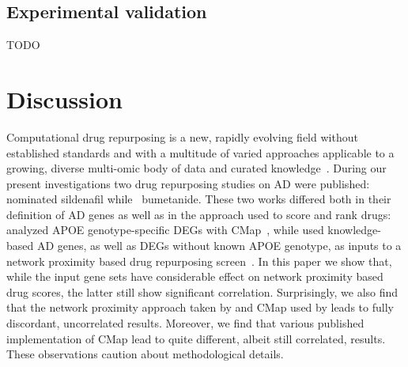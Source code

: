 \documentclass[letterpaper]{article}
\begin{document}
\subsection{Experimental validation}

TODO

\section{Discussion}

Computational drug repurposing is a new, rapidly evolving field without
established standards and with a multitude of varied approaches applicable to
a growing, diverse multi-omic body of data and curated
knowledge~\citep{Pushpakom2019}.  During our present investigations two drug
repurposing studies on AD were published: \cite{Fang2021} nominated sildenafil
while~\cite{Taubes2021} bumetanide.  These two works differed both in their
definition of AD genes as well as in the approach used to score and rank
drugs: \cite{Taubes2021} analyzed APOE genotype-specific DEGs with
CMap~\citep{Lamb2006}, while \cite{Fang2021} used knowledge-based AD genes, as
well as DEGs without known APOE genotype, as inputs to a network proximity
based drug repurposing screen~\citep{Cheng2018}.  In this paper we show that,
while the input gene sets have considerable effect on network proximity based
drug scores, the latter still show significant correlation.  Surprisingly, we
also find that the network proximity approach taken by \cite{Fang2021} and
CMap used by \cite{Taubes2021} leads to fully discordant, uncorrelated
results.  Moreover, we find that various published implementation of CMap lead
to quite different, albeit still correlated, results.  These observations
caution about methodological details.
\end{document}
